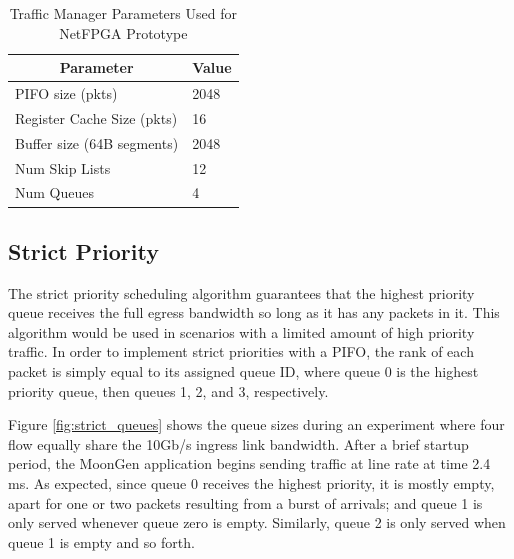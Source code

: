 \begin{table}[tbp]
\centering
\caption{Traffic Manager Parameters Used for NetFPGA Prototype}
\label{tab:params}
\begin{tabular}{|l|l|}
\hline
\multicolumn{1}{|c|}{\textbf{Parameter}} & \multicolumn{1}{c|}{\textbf{Value}} \\ \hline
PIFO size (pkts)                         & 2048                                \\ \hline
Register Cache Size (pkts)               & 16                                  \\ \hline
Buffer size (64B segments)               & 2048                                \\ \hline
Num Skip Lists                           & 12                                  \\ \hline
Num Queues                               & 4                                   \\ \hline
\end{tabular}
\end{table}

\subsection{Strict Priority}\label{sec:strict-demo}
The strict priority scheduling algorithm guarantees that the highest priority queue receives the full egress bandwidth so long as it has any packets in it. This algorithm would be used in scenarios with a limited amount of high priority traffic. In order to implement strict priorities with a PIFO, the rank of each packet is simply equal to its assigned queue ID, where queue 0 is the highest priority queue, then queues 1, 2, and 3, respectively.

Figure \ref{fig:strict_queues} shows the queue sizes during an experiment where four flow equally share the 10Gb/s ingress link bandwidth. After a brief startup period, the MoonGen application begins sending traffic at line rate at time 2.4 ms. As expected, since queue 0 receives the highest priority, it is mostly empty, apart for one or two packets resulting from a burst of arrivals; and queue 1 is only served whenever queue zero is empty. Similarly, queue 2 is only served when queue 1 is empty and so forth.


